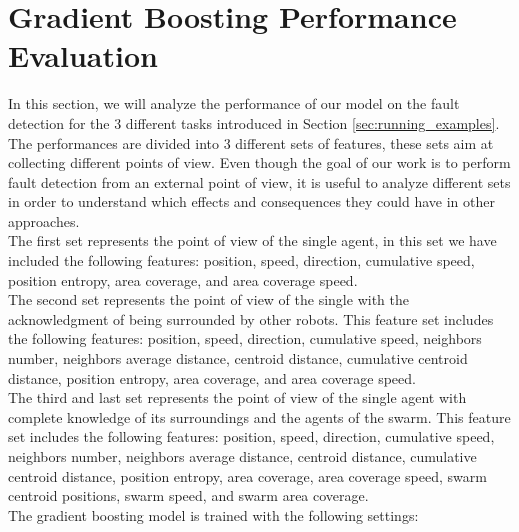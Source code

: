 \documentclass[../../Thesis.tex]{subfiles}
\begin{document}
	\section{Gradient Boosting Performance Evaluation}
	\label{sec:Experiments:gradient_boosting_performance_evaluation}%
		In this section, we will analyze the performance of our model on the fault detection for the 3 different tasks introduced in Section \ref{sec:running_examples}.  The performances are divided into 3 different sets of features,  these sets aim at collecting different points of view. Even though the goal of our work is to perform fault detection from an external point of view, it is useful to analyze different sets in order to understand which effects and consequences they could have in other approaches. \\
		The first set represents the point of view of the single agent, in this set we have included the following features: position, speed, direction, cumulative speed, position entropy, area coverage, and area coverage speed.\\
		The second set represents the point of view of the single with the acknowledgment of being surrounded by other robots. This feature set includes the following features: position, speed, direction, cumulative speed, neighbors number, neighbors average distance, centroid distance, cumulative centroid distance, position entropy, area coverage, and area coverage speed.\\
		The third and last set represents the point of view of the single agent with complete knowledge of its surroundings and the agents of the swarm. This feature set includes the following features: position, speed, direction, cumulative speed, neighbors number, neighbors average distance, centroid distance, cumulative centroid distance, position entropy, area coverage, area coverage speed, swarm centroid positions, swarm speed, and swarm area coverage.\\
		The gradient boosting model is trained with the following settings:
\end{document}
